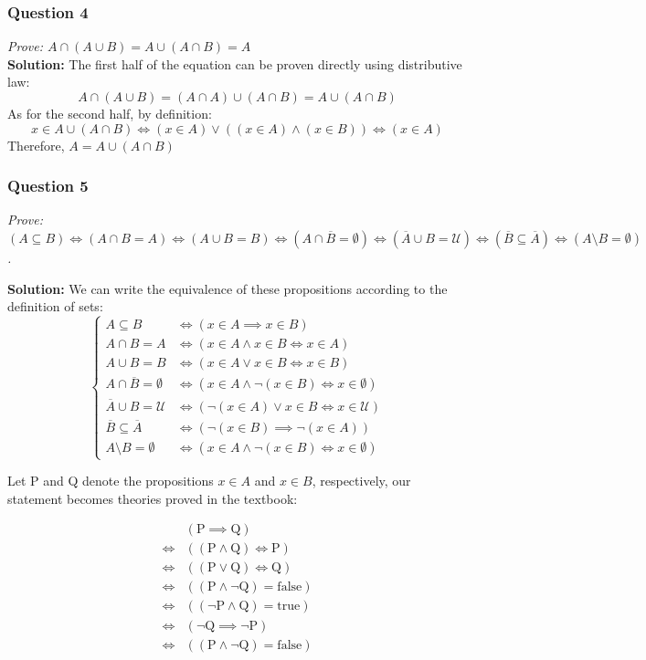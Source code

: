 \documentclass[
	letterpaper, %
	11pt, %
]{CSUniSchoolLabReport}
\begin{document}
\pagebreak

\subsubsection*{Question 4}
\textit{Prove: $A\cap \left(A \cup B\right) = A \cup \left(A \cap B\right) = A$} \\

\textbf{Solution: } The first half of the equation can be proven directly using distributive law: \[
	A\cap (A\cup B) = (A \cap A) \cup (A \cap B) = A \cup (A \cap B)
	\]
As for the second half, by definition: \[
	x \in A \cup (A \cap B)
	\iff (x \in A) \lor ((x \in A) \land (x \in B)) \iff (x \in A)
	\]
Therefore, $A = A \cup (A \cap B)$

\pagebreak

\subsubsection*{Question 5}
\textit{Prove: $\left(A\subseteq B\right) \iff \left(A\cap B = A\right) \iff \left(A\cup B = B\right) \iff \left(A\cap\overline{B} = \emptyset\right) \iff \left(\overline{A} \cup B = \mathcal{U}\right)\iff \left(\overline{B}\subseteq \overline{A}\right) \iff \left(A\setminus B = \emptyset\right)$.}

\textbf{Solution: } We can write the equivalence of these propositions according to the definition of sets: 
\[
\left\{
\begin{aligned}
	A \subseteq B &\iff (x \in A \implies x \in B) \\
	A \cap B = A &\iff (x \in A \land x \in B \iff x \in A) \\ 
	A \cup B = B &\iff (x \in A \lor x \in B \iff x \in B) \\
	A \cap \overline{B} = \emptyset &\iff (x \in A \land \lnot(x \in B) \iff x \in \emptyset) \\
	\overline{A} \cup B = \mathcal{U} &\iff (\lnot(x \in A) \lor x \in B \iff x \in \mathcal{U}) \\
	\overline{B} \subseteq \overline{A} &\iff (\lnot(x \in B) \implies \lnot(x \in A)) \\
	A \setminus B = \emptyset &\iff (x \in A \land \lnot(x \in B) \iff x \in \emptyset)
\end{aligned}
\right.
\]

Let P and Q denote the propositions $x \in A$ and $x \in B$, respectively, our statement becomes theories proved in the textbook:

\[
\begin{aligned}
	  &(\text{P} \implies \text{Q}) \\
	\iff{} &((\text{P} \land \text{Q}) \iff \text{P}) \\
	\iff{} &((\text{P} \lor \text{Q}) \iff \text{Q}) \\
	\iff{} &((\text{P} \land \lnot \text{Q}) = \text{false}) \\
	\iff{} &((\lnot \text{P} \land \text{Q}) = \text{true}) \\
	\iff{} &(\lnot \text{Q} \implies \lnot \text{P}) \\
	\iff{} &((\text{P} \land \lnot \text{Q}) = \text{false})
\end{aligned}
\]
\end{document}
